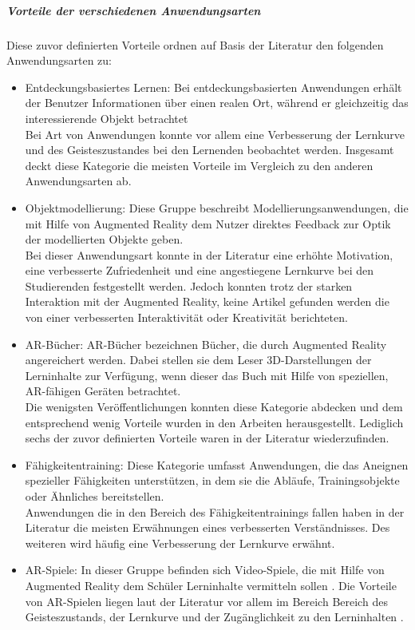 \subparagraph{Vorteile der verschiedenen Anwendungsarten}
Diese zuvor definierten Vorteile ordnen \citeauthor{diegmann:benefits-ar} auf Basis der Literatur den folgenden Anwendungsarten zu:
\begin{itemize}
\item Entdeckungsbasiertes Lernen: Bei entdeckungsbasierten Anwendungen erhält der Benutzer \glqq Informationen über einen realen Ort, während er gleichzeitig das interessierende Objekt betrachtet\grqq{} \citep[Kapitel 2.2]{diegmann:benefits-ar} \\
Bei Art von Anwendungen konnte vor allem eine Verbesserung der Lernkurve und des Geisteszustandes bei den Lernenden beobachtet werden. Insgesamt deckt diese Kategorie die meisten Vorteile im Vergleich zu den anderen Anwendungsarten ab. \citep[Kapitel 5]{diegmann:benefits-ar}
\item Objektmodellierung: Diese Gruppe beschreibt Modellierungsanwendungen, die mit Hilfe von Augmented Reality dem Nutzer direktes Feedback zur Optik der modellierten Objekte geben. \citep[Kapitel 2.2]{diegmann:benefits-ar} \\
Bei dieser Anwendungsart konnte in der Literatur eine erhöhte Motivation, eine verbesserte Zufriedenheit und eine angestiegene Lernkurve bei den Studierenden festgestellt werden. Jedoch konnten trotz der starken Interaktion mit der Augmented Reality, keine Artikel gefunden werden die von einer verbesserten Interaktivität oder Kreativität berichteten. \citep[Kapitel 5]{diegmann:benefits-ar}
\item AR-Bücher: AR-Bücher bezeichnen Bücher, die durch Augmented Reality angereichert werden. Dabei stellen sie dem Leser 3D-Darstellungen der Lerninhalte zur Verfügung, wenn dieser das Buch mit Hilfe von speziellen, AR-fähigen Geräten betrachtet. \citep[Kapitel 2.2]{diegmann:benefits-ar}\\
Die wenigsten Veröffentlichungen konnten diese Kategorie abdecken und dem entsprechend wenig Vorteile wurden in den Arbeiten herausgestellt. Lediglich sechs der zuvor definierten Vorteile waren in der Literatur wiederzufinden. \citep[Kapitel 5]{diegmann:benefits-ar}
\item Fähigkeitentraining: Diese Kategorie umfasst Anwendungen, die das Aneignen spezieller Fähigkeiten unterstützen, in dem sie die Abläufe, Trainingsobjekte oder Ähnliches bereitstellen. \citep[Kapitel 2.2]{diegmann:benefits-ar} \\
Anwendungen die in den Bereich des Fähigkeitentrainings fallen haben in der Literatur die meisten Erwähnungen eines verbesserten Verständnisses. Des weiteren wird häufig eine Verbesserung der Lernkurve erwähnt. \citep[Kapitel 5]{diegmann:benefits-ar}
\item AR-Spiele: In dieser Gruppe befinden sich Video-Spiele, die mit Hilfe von Augmented Reality dem Schüler Lerninhalte vermitteln sollen \citep[Kapitel 2.2]{diegmann:benefits-ar}.
Die Vorteile von AR-Spielen liegen laut der Literatur vor allem im Bereich Bereich des Geisteszustands, der Lernkurve und der Zugänglichkeit zu den Lerninhalten \citep[Kapitel 5]{diegmann:benefits-ar}.
\end{itemize}

